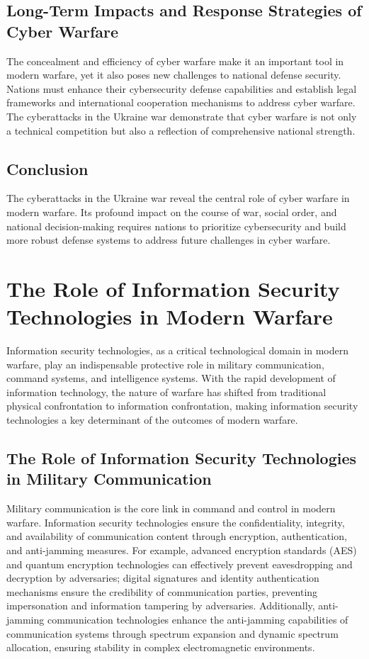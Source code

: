 \documentclass[12pt, a4paper]{article}
\begin{document}
\subsection{Long-Term Impacts and Response Strategies of Cyber Warfare}
The concealment and efficiency of cyber warfare make it an important tool in modern warfare, yet it also poses new challenges to national defense security. Nations must enhance their cybersecurity defense capabilities and establish legal frameworks and international cooperation mechanisms to address cyber warfare. The cyberattacks in the Ukraine war demonstrate that cyber warfare is not only a technical competition but also a reflection of comprehensive national strength.

\subsection{Conclusion}
The cyberattacks in the Ukraine war reveal the central role of cyber warfare in modern warfare. Its profound impact on the course of war, social order, and national decision-making requires nations to prioritize cybersecurity and build more robust defense systems to address future challenges in cyber warfare.

\section{The Role of Information Security Technologies in Modern Warfare}

Information security technologies, as a critical technological domain in modern warfare, play an indispensable protective role in military communication, command systems, and intelligence systems. With the rapid development of information technology, the nature of warfare has shifted from traditional physical confrontation to information confrontation, making information security technologies a key determinant of the outcomes of modern warfare.

\subsection{The Role of Information Security Technologies in Military Communication}

Military communication is the core link in command and control in modern warfare. Information security technologies ensure the confidentiality, integrity, and availability of communication content through encryption, authentication, and anti-jamming measures. For example, advanced encryption standards (AES) and quantum encryption technologies can effectively prevent eavesdropping and decryption by adversaries; digital signatures and identity authentication mechanisms ensure the credibility of communication parties, preventing impersonation and information tampering by adversaries. Additionally, anti-jamming communication technologies enhance the anti-jamming capabilities of communication systems through spectrum expansion and dynamic spectrum allocation, ensuring stability in complex electromagnetic environments.
\end{document}
